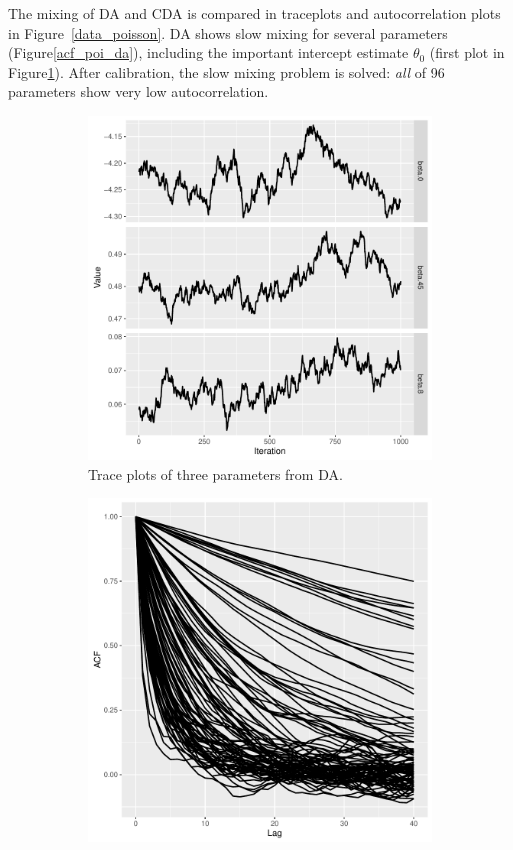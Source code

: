 \documentclass[10pt]{article}
\begin{document}
The mixing of DA and CDA is compared in traceplots and autocorrelation plots in Figure~\ref{data_poisson}. DA shows slow mixing for several parameters (Figure\ref{acf_poi_da}), including the important intercept estimate $\theta_0$ (first plot in Figure\ref{traceplot_poi_da}). After calibration, the slow mixing problem is solved:  {\it all} of 96 parameters show very low autocorrelation.

 \begin{figure}[H]
   \begin{subfigure}[b]{0.45\textwidth}
 \includegraphics[width=1\textwidth]{traceplot_poisson_da}
 \caption{Trace plots of three parameters from DA.}
  \label{traceplot_poi_da}
 \end{subfigure}
  \hfill 
 \begin{subfigure}[b]{0.45\textwidth}
 \includegraphics[width=1\textwidth]{poisson_da_acf.pdf}

\end{subfigure}
\end{figure}
\end{document}
